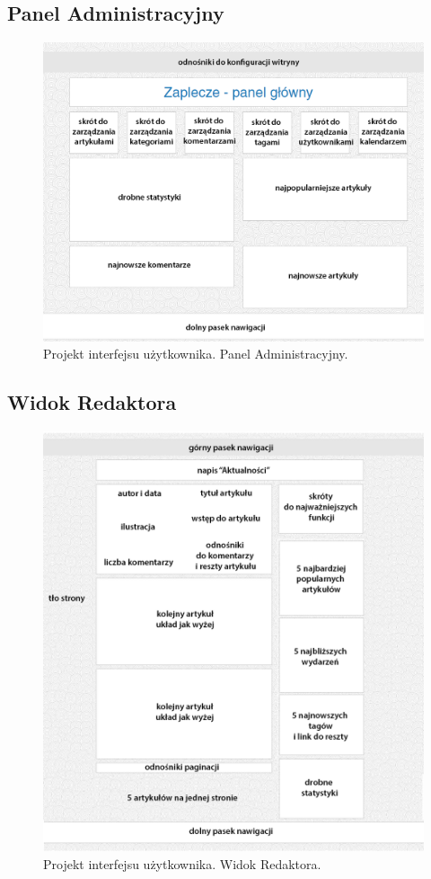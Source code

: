 \documentclass[openright]{xmgr}
\begin{document}
\subsection{Panel Administracyjny}
\begin{figure}[!tbh]
\centering
\includegraphics[width=.9\linewidth]{fig/gui_admin}
\caption{Projekt interfejsu użytkownika. Panel Administracyjny.}
\end{figure}

\newpage

\subsection{Widok Redaktora}
\begin{figure}[!tbh]
\centering
\includegraphics[width=.9\linewidth]{fig/gui_editor}
\caption{Projekt interfejsu użytkownika. Widok Redaktora.}
\end{figure}
\end{document}

